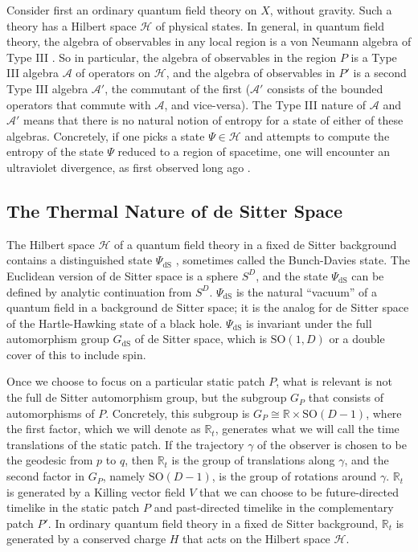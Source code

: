 \documentclass[11pt,a4paper]{article}
\def\A{{\mathcal A}}
\def\R{{\mathbb R}}
\def\H{{\mathcal H}}
\def\dS{{\mathrm{dS}}}
\def\SO{{\mathrm{SO}}}
\begin{document}
 Consider first an ordinary quantum field theory
on $X$,  without gravity.   Such a theory has a  Hilbert space $\H$ of physical states.  In general, in quantum field theory, the algebra of observables in any local
region is a von Neumann algebra of Type III \cite{Araki}.   So in particular, 
 the algebra of observables in the region $P$ is a  Type III  algebra $\A$ of operators on $\H$, 
 and the algebra of observables in $P'$ is a second Type III algebra
  $\A'$, the commutant of the first ($\A'$ consists of the bounded operators that commute with $\A$, and vice-versa).
  The Type III nature of $\A$ and $\A'$  means that there is no natural notion of entropy for a state of either of these algebras.   Concretely, if one picks a state 
  $\Psi\in\H$ and attempts to compute the entropy of the state $\Psi$ reduced to a 
  region of spacetime, one will encounter an ultraviolet divergence, as first observed long ago
  \cite{Sorkin, BKLS}.
 
 \subsection{The Thermal Nature of de Sitter Space}\label{thermal} 
  
  The Hilbert space $\H$ of a quantum field theory in a fixed de Sitter background contains a distinguished state $\Psi_\dS$  \cite{CT,SS,BD,Mo,Al}, sometimes called the Bunch-Davies state.
  The Euclidean version of de Sitter space is a sphere $S^D$, and the state $\Psi_\dS$ can be defined by analytic continuation from $S^D$.
$\Psi_\dS$ is  the natural ``vacuum'' of a quantum field in a background de Sitter space; it is the analog
for de Sitter space of the Hartle-Hawking state of a black hole.
$\Psi_\dS$ is invariant under the full automorphism group $G_\dS$ of de Sitter space, which is $\SO(1,D)$ or a double cover of this to include spin. 

Once we choose to focus on a particular static patch $P$, what is relevant is not the full de Sitter automorphism group, but the subgroup $G_P$ that
consists of automorphisms of $P$.   Concretely, this subgroup is $G_P\cong \R\times \SO(D-1)$, where the first factor, which we will denote as $\R_t$, 
generates what we will call the time translations of the
static patch.    If the trajectory $\gamma$ of the observer is chosen to be the geodesic from $p$ to $q$, then $\R_t$ is the group of translations along $\gamma$, and the
second factor in $G_P$, namely $\SO(D-1)$, is the group of  rotations around $\gamma$.  
  $\R_t$ is generated by a Killing vector field $V$ that we can choose to be future-directed timelike in the
static patch $P$ and past-directed timelike in the complementary patch $P'$.   In ordinary quantum field theory in a fixed de Sitter background, $\R_t$ is generated by
a conserved charge $H$ that acts on the Hilbert space $\H$.
\end{document}

